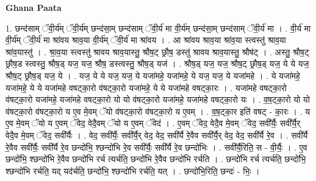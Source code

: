 \documentclass[17pt]{extarticle}
\begin{document}
\textbf{Ghana Paata } \newline

1. छन्द॑साम् ॅवी॒र्य॑म् ॅवी॒र्य॑म् छन्द॑सा॒म् छन्द॑साम् ॅवी॒र्य॑ मा वी॒र्य॑म् छन्द॑सा॒म् छन्द॑साम् ॅवी॒र्य॑ मा । . वी॒र्य॑ मा वी॒र्य॑म् ॅवी॒र्य॑ मा श्रा॑वय श्राव॒या वी॒र्य॑म् ॅवी॒र्य॑ मा श्रा॑वय । . आ श्रा॑वय श्राव॒या श्रा॑व॒या स्त्वस्तु॑ श्राव॒या श्रा॑व॒यास्तु॑ । . श्रा॒व॒या स्त्वस्तु॑ श्रावय श्राव॒यास्तु॒ श्रौष॒ट् छ्रौष॒ डस्तु॑ श्रावय श्राव॒यास्तु॒ श्रौष॑ट् । . अस्तु॒ श्रौष॒ट् छ्रौष॒ड स्त्वस्तु॒ श्रौष॒ड् यज॒ यज॒ श्रौष॒ डस्त्वस्तु॒ श्रौष॒ड् यज॑ । . श्रौष॒ड् यज॒ यज॒ श्रौष॒ट् छ्रौष॒ड् यज॒ ये ये यज॒ श्रौष॒ट् छ्रौष॒ड् यज॒ ये । . यज॒ ये ये यज॒ यज॒ ये यजा॑महे॒ यजा॑महे॒ ये यज॒ यज॒ ये यजा॑महे । . ये यजा॑महे॒ यजा॑महे॒ ये ये यजा॑महे वषट्का॒रो व॑षट्का॒रो यजा॑महे॒ ये ये यजा॑महे वषट्का॒रः । . यजा॑महे वषट्का॒रो व॑षट्का॒रो यजा॑महे॒ यजा॑महे वषट्का॒रो यो यो व॑षट्का॒रो यजा॑महे॒ यजा॑महे वषट्का॒रो यः । . व॒ष॒ट्का॒रो यो यो व॑षट्का॒रो व॑षट्का॒रो य ए॒व मे॒वम् ॅयो व॑षट्का॒रो व॑षट्का॒रो य ए॒वम् । . व॒ष॒ट्का॒र इति॑ वषट् - का॒रः । . य ए॒व मे॒वम् ॅयो य ए॒वम् ॅवेद॒ वेदै॒वम् ॅयो य ए॒वम् ॅवेद॑ । . ए॒वम् ॅवेद॒ वेदै॒व मे॒वम् ॅवेद॒ सवी᳚र्यैः॒ सवी᳚र्यै॒र् वेदै॒व मे॒वम् ॅवेद॒ सवी᳚र्यैः । . वेद॒ सवी᳚र्यैः॒ सवी᳚र्यै॒र् वेद॒ वेद॒ सवी᳚र्यै रे॒वैव सवी᳚र्यै॒र् वेद॒ वेद॒ सवी᳚र्यै रे॒व । . सवी᳚र्यै रे॒वैव सवी᳚र्यैः॒ सवी᳚र्यै रे॒व छन्दो॑भि॒ श्छन्दो॑भि रे॒व सवी᳚र्यैः॒ सवी᳚र्यै रे॒व छन्दो॑भिः । . सवी᳚र्यै॒रिति॒ स - वी॒र्यैः॒ । . ए॒व छन्दो॑भि॒ श्छन्दो॑भि रे॒वैव छन्दो॑भि रर्च त्यर्चति॒ छन्दो॑भि रे॒वैव छन्दो॑भि रर्चति । . छन्दो॑भि रर्च त्यर्चति॒ छन्दो॑भि॒ श्छन्दो॑भि रर्चति॒ यद् यद॑र्चति॒ छन्दो॑भि॒ श्छन्दो॑भि रर्चति॒ यत् । . छन्दो॑भि॒रिति॒ छन्दः॑ - भिः॒ । \newline
\end{document}
